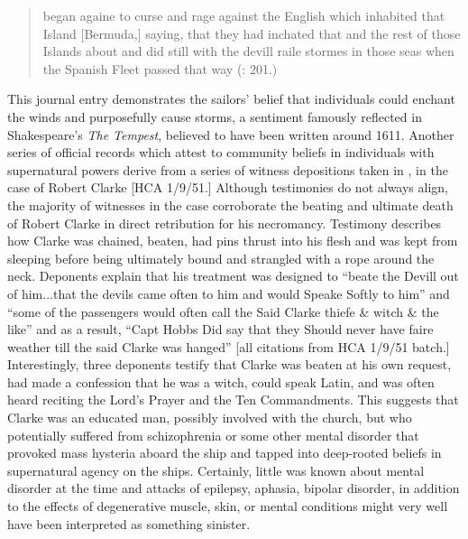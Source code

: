 \begin{quotation}
began againe to curse and rage against the English which inhabited that Island [Bermuda,] saying, that they had inchated that and the rest of those Islands about and did still with the devill raile stormes in those seas when the Spanish Fleet passed that way (\citealt{Gage1648}: 201.) \end{quotation}

This journal entry demonstrates the sailors’ belief that individuals could enchant the winds and purposefully cause storms, a sentiment famously reflected in Shakespeare’s \textit{The Tempest}, believed to have been written around 1611. Another series of official records which attest to community beliefs in individuals with supernatural powers derive from a series of witness depositions taken in \citealt{Virginia1661}, in the case of Robert Clarke [HCA 1/9/51.] Although testimonies do not always align, the majority of witnesses in the case corroborate the beating and ultimate death of Robert Clarke in direct retribution for his necromancy. Testimony describes how Clarke was chained, beaten, had pins thrust into his flesh and was kept from sleeping before being ultimately bound and strangled with a rope around the neck. Deponents explain that his treatment was designed to “beate the Devill out of him...that the devils came often to him and would Speake Softly to him” and “some of the passengers would often call the Said Clarke thiefe \& witch \& the like” and as a result, “Capt Hobbs Did say that they Should never have faire weather till the said Clarke was hanged” [all citations from HCA 1/9/51 batch.] Interestingly, three deponents testify that Clarke was beaten at his own request, had made a confession that he was a witch, could speak Latin, and was often heard reciting the Lord’s Prayer and the Ten Commandments. This suggests that Clarke was an educated man, possibly involved with the church, but who potentially suffered from schizophrenia or some other mental disorder that provoked mass hysteria aboard the ship and tapped into deep-rooted beliefs in supernatural agency on the ships. Certainly, little was known about mental disorder at the time and attacks of epilepsy, aphasia, bipolar disorder, in addition to the effects of degenerative muscle, skin, or mental conditions might very well have been interpreted as something sinister. 

